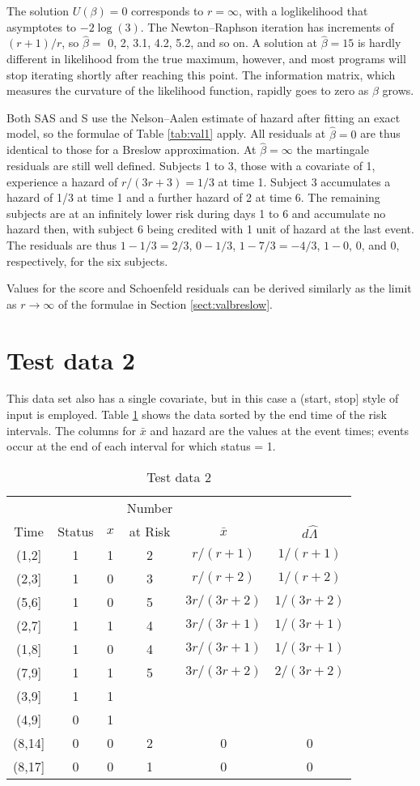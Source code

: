 \documentclass[11pt]{article}
\def\bhat{\hat \beta}        %
\def\xbar{\bar x}
\def\lhat{\hat \Lambda}
\begin{document}
The solution $U(\beta)=0$ corresponds to $r=\infty$, with a loglikelihood
that asymptotes to $-2\log(3)$.  
The Newton--Raphson iteration has increments of $(r+1)/r$, 
so $\bhat=$ 0, 2, 3.1, 4.2, 5.2, and so on.
A solution at $\bhat=15$ is hardly different in likelihood from the
true maximum, however, and most programs will stop iterating shortly
after reaching this point.  
The information matrix, which measures the curvature of the likelihood
function, rapidly goes to zero as $\beta$ grows.

   Both SAS and S use the Nelson--Aalen estimate of hazard after
fitting an exact model, so the formulae of Table \ref{tab:val1} apply.
All residuals at $\bhat=0$ are thus identical to those for a
Breslow approximation.
At $\bhat=\infty$ the martingale residuals are still well defined.
Subjects 1 to 3, those with a covariate of 1, experience a hazard of
$r/(3r+3)=1/3$ at time 1.  Subject 3 accumulates a hazard of 1/3 at
time 1 and a further hazard of 2 at time 6.
The remaining subjects are at an infinitely lower risk during days
1 to 6 and accumulate no hazard then, with subject 6 being credited with
1 unit of hazard at the last event.
The residuals are thus $1-1/3=2/3$, $0-1/3$, $1-7/3= -4/3$, $1-0$, 0, and 0, 
respectively, for the six subjects.

Values for the score and Schoenfeld residuals can be
derived similarly as the limit as $r\rightarrow \infty$ of the formulae
in Section \ref{sect:valbreslow}.

\section{Test data 2}
This data set also has a single covariate, but in this case 
a (start, stop] style of input is employed.
Table \ref{tab:val2} shows the data sorted by the end time of the risk
intervals.  The columns for $\xbar$ and hazard are the values
at the event times; events occur at the end of 
each interval for which status = 1.
\begin{table}\centering
\begin{tabular}{ccc|ccc}
&&&Number& \\
Time&Status&$x$&at Risk& $\xbar$& $d\lhat$ \\ \hline 
(1,2] &1 &1 &2 &$r/(r+1)$    & $1/(r+1)$\\
(2,3] &1 &0 &3 & $r/(r+2)$   & $1/(r+2)$ \\
(5,6] &1 &0 &5 & $3r/(3r+2)$ & $1/(3r+2)$ \\
(2,7] &1 &1 &4 & $3r/(3r+1)$ & $1/(3r+1)$ \\
(1,8] &1 &0 &4 & $3r/(3r+1)$ & $1/(3r+1)$ \\
(7,9] &1 &1 &5 & $3r/(3r+2)$ & $2/(3r+2)$ \\
(3,9] &1 &1 && \\
(4,9] &0 &1 && \\
(8,14]&0 &0 &2& 0&0 \\
(8,17]&0 &0 &1& 0&0 \\
\end{tabular}
\caption{Test data 2}
\label{tab:val2}
\end{table}
\end{document}
